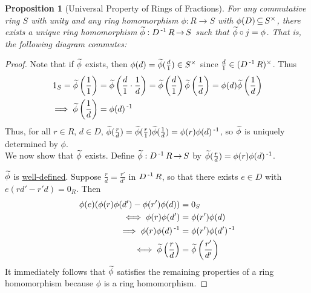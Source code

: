 \documentclass[11pt]{book}
\newcounter{counter}
\newtheorem{proposition}[counter]{Proposition}   \newtheorem{problem}[counter]{Problem}   \newtheorem*{proposition*}{Proposition}   \newtheorem*{lemma*}{Lemma}
\theoremstyle{definition}   \newtheorem{defn}[counter]{Definition} %
\DeclareMathOperator{\ra}{\rightarrow}   \DeclareMathOperator{\Poly}{\mathbf{P}}   \DeclareMathOperator{\spn}{\textnormal{span}}   \DeclareMathOperator{\aut}{\textnormal{Aut}}
\newcommand{\vs}{\vspace{8pt}}
\numberwithin{counter}{chapter}
\begin{document}
\vs

\begin{proposition}[Universal Property of Rings of Fractions]
For any commutative ring $S$ with unity and any ring homomorphism $\phi : R \ra S$ with $\phi(D) \operatorname{\subseteq} S^{\times}$, there exists a unique ring homomorphism $\wt{\phi} : D\inv R \ra S$ such that $\widetilde{\phi} \circ j = \phi$. That is, the following diagram commutes:
\end{proposition}

\begin{proof}
Note that if $\widetilde{\phi}$ exists, then $\phi(d) = \widetilde{\phi}(\frac{d}{1}) \in S^{\times}$ since $\frac{d}{1} \in (D\operatorname{^{-1}} R)^{\times}$. Thus
\begin{align*}
1_S = \widetilde{\phi} \left( \frac{1}{1} \right) &= \widetilde{\phi} \left( \frac{d}{1} \cdot \frac{1}{d} \right) = \widetilde{\phi} \left( \frac{d}{1} \right) \widetilde{\phi} \left(\frac{1}{d} \right) = \phi(d) \widetilde{\phi} \left(\frac{1}{d} \right) \\
\implies \widetilde{\phi} \left(\frac{1}{d} \right) &= \phi(d)\operatorname{^{-1}}
\end{align*}
Thus, for all $r \in R$, $d \in D$, $\widetilde{\phi}(\frac{r}{d}) = \widetilde{\phi}(\frac{r}{1}) \widetilde{\phi}(\frac{1}{d}) = \phi(r) \phi(d)\operatorname{^{-1}}$, so $\widetilde{\phi}$ is uniquely determined by $\phi$. \\

We now show that $\widetilde{\phi}$ exists. Define $\wt{\phi} : D\inv R \ra S$ by $\widetilde{\phi}(\frac{r}{d}) = \phi(r) \phi(d)\operatorname{^{-1}}$.

$\widetilde{\phi}$ is \underline{well-defined}. Suppose $\frac{r}{d} = \frac{r'}{d'}$ in $D\operatorname{^{-1}} R$, so that there exists $e \in D$ with $e(rd'-r'd) = 0_R$. Then
\begin{align*}
\phi(e) (\phi(r)\phi(d') - \phi(r')\phi(d)) &= 0_S \\
\iff \phi(r)\phi(d') &= \phi(r') \phi(d) \\
\implies \phi(r)\phi(d)\operatorname{^{-1}} &= \phi(r')\phi(d')\operatorname{^{-1}} \\
\iff \widetilde{\phi} \left( \frac{r}{d} \right) &= \widetilde{\phi} \left( \frac{r'}{d'} \right)
\end{align*}
It immediately follows that $\widetilde{\phi}$ satisfies the remaining properties of a ring homomorphism because $\phi$ is a ring homomorphism.
\end{proof}
\end{document}

